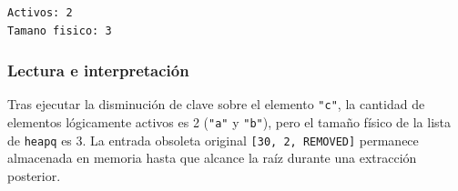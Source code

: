 \begin{lstlisting}[style=consolestyle, caption={Salida de consola del Ejercicio Resuelto 3}]
Activos: 2
Tamano fisico: 3
\end{lstlisting}

\subsubsection*{Lectura e interpretación}
Tras ejecutar la disminución de clave sobre el elemento \texttt{"c"}, la cantidad de elementos lógicamente activos es 2 (\texttt{"a"} y \texttt{"b"}), pero el tamaño físico de la lista de \texttt{heapq} es 3. La entrada obsoleta original \texttt{[30, 2, REMOVED]} permanece almacenada en memoria hasta que alcance la raíz durante una extracción posterior.

